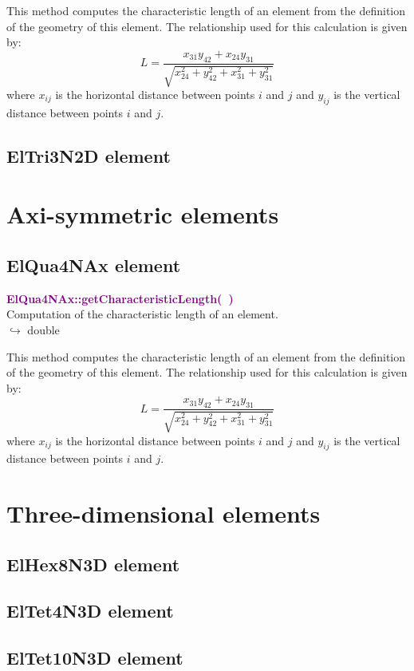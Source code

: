 This method computes the characteristic length of an element from the definition of the geometry of this element.
The relationship used for this calculation is given by:
\begin{equation}
L=\frac{x_{31} y_{42}+x_{24} y_{31}}{\sqrt{x_{24}^2+y_{42}^2+x_{31}^2+y_{31}^2}}
\end{equation}
where $x_{ij}$ is the horizontal distance between points $i$ and $j$ and $y_{ij}$ is the vertical distance between points $i$ and $j$.

\subsection{ElTri3N2D element}

\section{Axi-symmetric elements}

\subsection{ElQua4NAx element}

\textcolor{purple}{\textbf{ElQua4NAx::getCharacteristicLength(~)}}\label{ElQua4NAx::getCharacteristicLength()}\\
Computation of the characteristic length of an element.\\ \hspace*{10mm}$\hookrightarrow$ double

This method computes the characteristic length of an element from the definition of the geometry of this element.
The relationship used for this calculation is given by:
\begin{equation}
L=\frac{x_{31} y_{42}+x_{24} y_{31}}{\sqrt{x_{24}^2+y_{42}^2+x_{31}^2+y_{31}^2}}
\end{equation}
where $x_{ij}$ is the horizontal distance between points $i$ and $j$ and $y_{ij}$ is the vertical distance between points $i$ and $j$.

\section{Three-dimensional elements}

\subsection{ElHex8N3D element}

\subsection{ElTet4N3D element}

\subsection{ElTet10N3D element}
